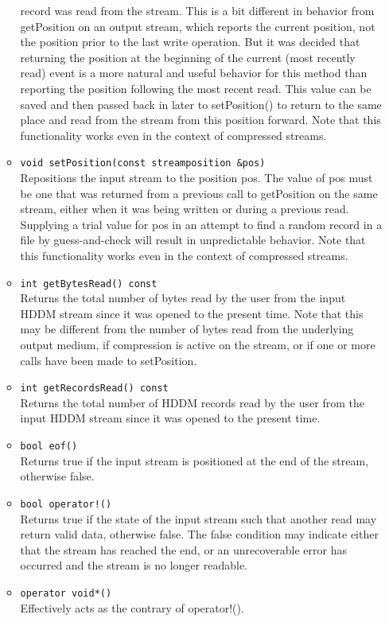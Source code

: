 \documentclass{revtex4}
\begin{document}
\begin{itemize}
\begin{itemize}
record was read from the stream. This is a bit different in behavior from 
getPosition on an output stream, which reports the current position, not the
position prior to the last write operation. But it was decided that returning
the position at the beginning of the current (most recently read) event is a
more natural and useful behavior for this method than reporting the position
following the most recent read. This value can be saved and then passed back
in later to setPosition() to return to the same place and read from the stream
from this position forward. Note that this functionality works even in the
context of compressed streams.
\item \texttt{void setPosition(const streamposition \&pos)}\\
Repositions the input stream to the position pos. The value of pos must be one
that was returned from a previous call to getPosition on the same stream, either
when it was being written or during a previous read. Supplying a trial value
for pos in an attempt to find a random record in a file by guess-and-check will
result in unpredictable behavior. Note that this functionality works even in
the context of compressed streams.
\item \texttt{int getBytesRead() const}\\
Returns the total number of bytes read by the user from the input HDDM stream 
since it was opened to the present time. Note that this may be different from
the number of bytes read from the underlying output medium, if compression is
active on the stream, or if one or more calls have been made to setPosition.
\item \texttt{int getRecordsRead() const}\\
Returns the total number of HDDM records read by the user from the input HDDM
stream since it was opened to the present time.
\item \texttt{bool eof()}\\
Returns true if the input stream is positioned at the end of the stream,
otherwise false.
\item \texttt{bool operator!()}\\
Returns true if the state of the input stream such that another read may
return valid data, otherwise false. The false condition may indicate either
that the stream has reached the end, or an unrecoverable error has occurred
and the stream is no longer readable.
\item \texttt{operator void*()}\\
Effectively acts as the contrary of operator!().
\end{itemize}


\end{itemize}
\end{document}
